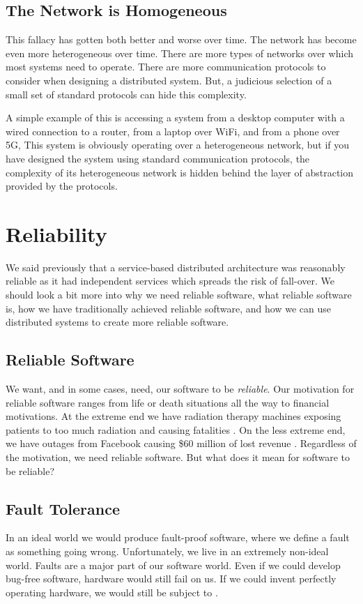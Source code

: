 \subsection{The Network is Homogeneous}
This fallacy has gotten both better and worse over time.
The network has become even more heterogeneous over time.
There are more types of networks over which most systems need to operate.
There are more communication protocols to consider when designing a distributed system.
But, a judicious selection of a small set of standard protocols can hide this complexity.

A simple example of this is accessing a system from a desktop computer with a wired connection to a router,
from a laptop over WiFi, and from a phone over 5G,
This system is obviously operating over a heterogeneous network,
but if you have designed the system using standard communication protocols,
the complexity of its heterogeneous network is hidden behind the layer of abstraction provided by the protocols.


\section{Reliability}
We said previously that a service-based distributed architecture was reasonably reliable as it had independent services which spreads the risk of fall-over.
We should look a bit more into why we need reliable software,
what reliable software is,
how we have traditionally achieved reliable software,
and how we can use distributed systems to create more reliable software.

\subsection{Reliable Software}
We want, and in some cases, need, our software to be \textsl{reliable}.
Our motivation for reliable software ranges from life or death situations all the way to financial motivations.
At the extreme end we have radiation therapy machines exposing patients to too much radiation and causing fatalities \cite{therac}.
On the less extreme end,
we have outages from Facebook causing \$60 million of lost revenue \cite{facebook-outage}.
Regardless of the motivation,
we need reliable software.
But what does it mean for software to be reliable?

\subsection{Fault Tolerance}
In an ideal world we would produce fault-proof software,
where we define a fault as something going wrong.
Unfortunately, we live in an extremely non-ideal world.
Faults are a major part of our software world.
Even if we could develop bug-free software,
hardware would still fail on us.
If we could invent perfectly operating hardware,
we would still be subject to .

